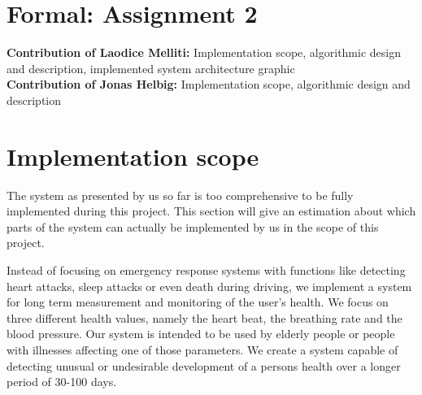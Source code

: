 \section{Formal: Assignment 2}
\textbf{Contribution of Laodice Melliti:} Implementation scope, algorithmic design and description, implemented system architecture graphic\\
\textbf{Contribution of Jonas Helbig:}  Implementation scope, algorithmic design and description\\
\section{Implementation scope}
\indent					%
\indent
The system as presented by us so far is too comprehensive to be fully implemented during this project. This section will give an estimation about which parts of the system can actually be implemented by us in the scope of this project.

Instead of focusing on emergency response systems with functions like detecting heart attacks, sleep attacks or even death during driving, we implement a system for long term measurement and monitoring of the user's health.
We focus on three different health values, namely the heart beat, the breathing rate and the blood pressure. Our system is intended to be used by elderly people or people with illnesses affecting one of those parameters. 
We create a system capable of detecting unusual or undesirable development of a persons health over a longer period of 30-100 days.

